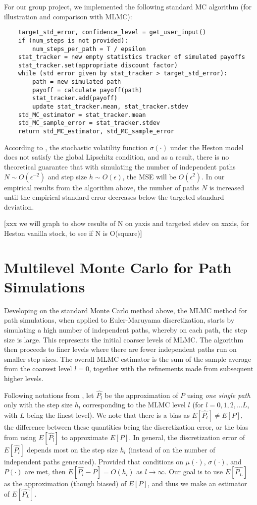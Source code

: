 \documentclass{article}
\begin{document}
    For our group project, we implemented the following standard MC algorithm (for illustration and comparison with MLMC):
    \begin{lstlisting}
	target_std_error, confidence_level = get_user_input()
    if (num_steps is not provided):
        num_steps_per_path = T / epsilon
    stat_tracker = new empty statistics tracker of simulated payoffs
    stat_tracker.set(appropriate discount factor)
    while (std error given by stat_tracker > target_std_error):
        path = new simulated path
        payoff = calculate payoff(path)
        stat_tracker.add(payoff)
        update stat_tracker.mean, stat_tracker.stdev
    std_MC_estimator = stat_tracker.mean
    std_MC_sample_error = stat_tracker.stdev
    return std_MC_estimator, std_MC_sample_error
    \end{lstlisting}
    
    According to \cite{giles08}, the stochastic volatility function $\sigma(\cdot)$ under the Heston model does not satisfy the global Lipschitz condition, and as a result, there is no theoretical guarantee that with simulating the number of independent paths $N \sim O(\epsilon^{-2})$ and step size $h \sim O(\epsilon)$, the MSE will be $O(\epsilon^2)$. In our empirical results from the algorithm above, the number of paths $N$ is increased until the empirical standard error decreases below the targeted standard deviation. 
    
    [xxx we will graph to show results of N on yaxis and targeted stdev on xaxis, for Heston vanilla stock, to see if N is O(square)]	

\section{Multilevel Monte Carlo for Path Simulations}
	Developing on the standard Monte Carlo method above, the MLMC method for path simulations, when applied to Euler-Maruyama discretization, starts by simulating a high number of independent paths, whereby on each path, the step size is large. This represents the initial coarser levels of MLMC. The algorithm then proceeds to finer levels where there are fewer independent paths run on smaller step sizes. The overall MLMC estimator is the sum of the sample average from the coarsest level $l=0$, together with the refinements made from subsequent higher levels.
	
	Following notations from \cite{giles08}, let $\widehat{P_l}$ be the approximation of $P$ using \textit{one single path} only with the step size $h_l$ corresponding to the MLMC level $l$ (for $l=0,1,2,...L$, with $L$ being the finest level). We note that there is a bias as $E[\widehat{P_l}] \neq E[P]$, the difference between these quantities being the discretization error, or the bias from using $E[\widehat{P_l}]$ to approximate $E[P]$. In general, the discretization error of $E[\widehat{P_l}]$ depends most on the step size $h_l$ (instead of on the number of independent paths generated). Provided that  conditions on $\mu(\cdot)$, $\sigma(\cdot)$, and $P(\cdot)$ are met, then $E[\widehat{P_l} - P] = O(h_l)$ as $l\rightarrow \infty$. Our goal is to use $E[\widehat{P_L}]$ as the approximation (though biased) of $E[P]$, and thus we make an estimator of $E[\widehat{P_L}]$.
	
\end{document}
